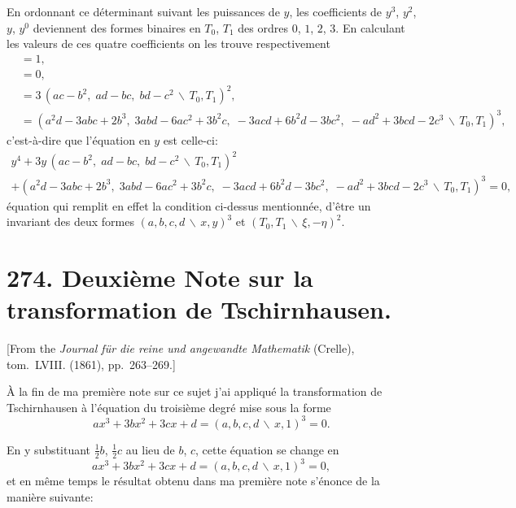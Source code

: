 \documentclass[11pt,a4paper]{book}
\begin{document}
En ordonnant ce d\'{e}terminant suivant les puissances de $y$, les coefficients de
$y^{3}$, $y^{2}$, $y$, $y^{0}$ deviennent des formes binaires en $T_{0}$, $T_{1}$ des ordres
$0$, $1$, $2$, $3$. En calculant les valeurs de ces quatre coefficients on les trouve
respectivement
\begin{align*}
&= 1,\\
&= 0,\\
&= 3\,(ac-b^{2},\; ad-bc,\; bd-c^{2}\,\backslash\!\!\,T_{0},T_{1})^{2},\\
&= (a^{2}d-3abc+2b^{3},\; 3abd-6ac^{2}+3b^{2}c,\; -3acd+6b^{2}d-3bc^{2},\; -ad^{2}+3bcd-2c^{3}\,\backslash\!\!\,T_{0},T_{1})^{3},
\end{align*}
c'est-\`{a}-dire que l'\'{e}quation en $y$ est celle-ci:
\begin{multline*}
y^{4} + 3y\,(ac-b^{2},\; ad-bc,\; bd-c^{2}\,\backslash\!\!\,T_{0},T_{1})^{2} \\
+ (a^{2}d-3abc+2b^{3},\; 3abd-6ac^{2}+3b^{2}c,\; -3acd+6b^{2}d-3bc^{2},\; -ad^{2}+3bcd-2c^{3}\,\backslash\!\!\,T_{0},T_{1})^{3} = 0,
\end{multline*}
\'{e}quation qui remplit en effet la condition ci-dessus mentionn\'{e}e, d'\^{e}tre un invariant
des deux formes $(a,b,c,d\,\backslash\!\!\,x,y)^{3}$ et $(T_{0},T_{1}\,\backslash\!\!\,\xi,-\eta)^{2}$.

\newpage
\section*{274. Deuxi\`{e}me Note sur la transformation de Tschirnhausen.}

[From the \textit{Journal f\"{u}r die reine und angewandte Mathematik} (Crelle),
tom.~LVIII. (1861), pp.~263--269.]
\vspace{0.5em}

\`{A} la fin de ma premi\`{e}re note sur ce sujet j'ai appliqu\'{e} la transformation de
Tschirnhausen \`{a} l'\'{e}quation du troisi\`{e}me degr\'{e} mise sous la forme
\[ax^{3}+3bx^{2}+3cx+d = (a,b,c,d\,\backslash\!\!\,x,1)^{3} = 0.\]

En y substituant $\tfrac{1}{2}b$, $\tfrac{1}{2}c$ au lieu de $b$, $c$, cette \'{e}quation se change en
\[ax^{3}+3bx^{2}+3cx+d = (a,b,c,d\,\backslash\!\!\,x,1)^{3} = 0,\]
et en m\^{e}me temps le r\'{e}sultat obtenu dans ma premi\`{e}re note s'\'{e}nonce de la
mani\`{e}re suivante:
\end{document}
